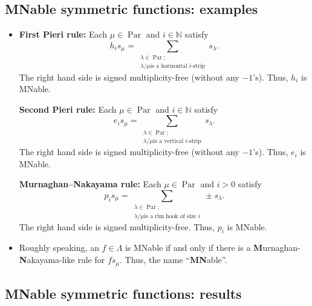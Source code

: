 \documentclass[numbers=enddot,12pt,final,onecolumn,notitlepage]{scrartcl}%
\newcommand{\0}{\phantom{c}}
\let\sumnonlimits\sum
\renewcommand{\sum}{\sumnonlimits\limits}
\begin{document}
\subsection{MNable symmetric functions: examples}

\begin{itemize}
\item {\textbf{First Pieri rule:} Each $\mu\in\operatorname*{Par}$ and
$i\in\mathbb{N}$ satisfy%
\[
h_{i}s_{\mu}=\sum_{\substack{\lambda\in\operatorname*{Par};\\\lambda/\mu\text{
is a horizontal }i\text{-strip}}}s_{\lambda}.
\]
The right hand side is signed multiplicity-free (without any $-1$'s). Thus,
$h_{i}$ is MNable.}

{\textbf{Second Pieri rule:} Each $\mu\in\operatorname*{Par}$ and
$i\in\mathbb{N}$ satisfy%
\[
e_{i}s_{\mu}=\sum_{\substack{\lambda\in\operatorname*{Par};\\\lambda/\mu\text{
is a vertical }i\text{-strip}}}s_{\lambda}.
\]
The right hand side is signed multiplicity-free (without any $-1$'s). Thus,
$e_{i}$ is MNable.}

{\textbf{Murnaghan--Nakayama rule:} Each $\mu\in\operatorname*{Par}$ and $i>0$
satisfy
\[
p_{i}s_{\mu}=\sum_{\substack{\lambda\in\operatorname*{Par};\\\lambda/\mu\text{
is a rim hook of size }i}} \pm s_{\lambda}.
\]
The right hand side is signed multiplicity-free. Thus, $p_{i}$ is MNable.}

\item Roughly speaking, an $f\in\Lambda$ is MNable if and only if there is a
\textbf{M}urnaghan-\textbf{N}akayama-like rule for $fs_{\mu}$. Thus, the name
\textquotedblleft\textbf{MN}able\textquotedblright.
\end{itemize}

\subsection{MNable symmetric functions: results}
\end{document}
